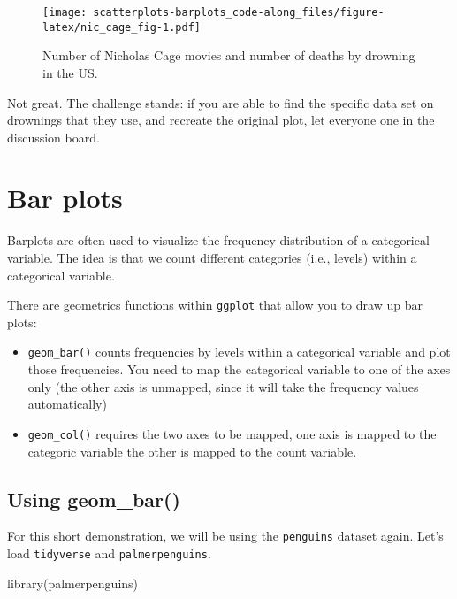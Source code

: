 \documentclass[
]{article}
\newenvironment{Shaded}{\begin{snugshade}}{\end{snugshade}}
\newcommand{\FunctionTok}[1]{\textcolor[rgb]{0.00,0.00,0.00}{#1}}
\newcommand{\NormalTok}[1]{#1}
\providecommand{\tightlist}{%
  \setlength{\itemsep}{0pt}\setlength{\parskip}{0pt}}
\begin{document}
\begin{figure}
\centering
\texttt{[image: scatterplots-barplots\_code-along\_files/figure-latex/nic\_cage\_fig-1.pdf]}
\caption{Number of Nicholas Cage movies and number of deaths by drowning
in the US.}
\end{figure}

Not great. The challenge stands: if you are able to find the specific
data set on drownings that they use, and recreate the original plot, let
everyone one in the discussion board.

\hypertarget{bar-plots}{%
\section{Bar plots}\label{bar-plots}}

Barplots are often used to visualize the frequency distribution of a
categorical variable. The idea is that we count different categories
(i.e., levels) within a categorical variable.

There are geometrics functions within \texttt{ggplot} that allow you to
draw up bar plots:

\begin{itemize}
\tightlist
\item
  \texttt{geom\_bar()} counts frequencies by levels within a categorical
  variable and plot those frequencies. You need to map the categorical
  variable to one of the axes only (the other axis is unmapped, since it
  will take the frequency values automatically)
\item
  \texttt{geom\_col()} requires the two axes to be mapped, one axis is
  mapped to the categoric variable the other is mapped to the count
  variable.
\end{itemize}

\hypertarget{using-geom_bar}{%
\subsection{Using geom\_bar()}\label{using-geom_bar}}

For this short demonstration, we will be using the \texttt{penguins}
dataset again. Let's load \texttt{tidyverse} and
\texttt{palmerpenguins}.

\begin{Shaded}
\begin{Highlighting}[]
\FunctionTok{library}\NormalTok{(palmerpenguins)}
\end{Highlighting}
\end{Shaded}
\end{document}
